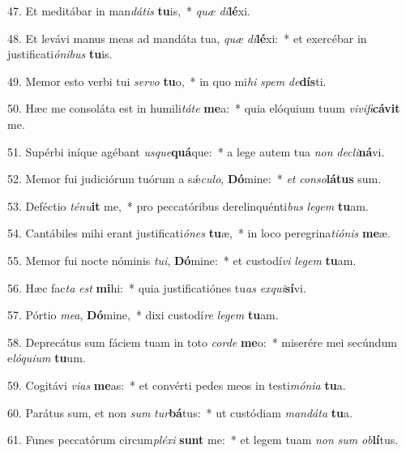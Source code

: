 47. Et meditábar in man\textit{dá}\textit{tis} \textbf{tu}is,~*  \textit{quæ} \textit{di}\textbf{lé}xi.\

48. Et levávi manus meas ad mandáta tua, \textit{quæ} \textit{di}\textbf{lé}xi:~*  et exercébar in justificati\textit{ó}\textit{ni}\textit{bus} \textbf{tu}is.\

49. Memor esto verbi tui \textit{ser}\textit{vo} \textbf{tu}o,~*  in quo mi\textit{hi} \textit{spem} \textit{de}\textbf{dís}ti.\

50. Hæc me consoláta est in humili\textit{tá}\textit{te} \textbf{me}a:~*  quia elóquium tuum \textit{vi}\textit{vi}\textit{fi}\textbf{cá}\textbf{vit} me.\

51. Supérbi iníque agébant \textit{us}\textit{que}\textbf{quá}que:~*  a lege autem tua \textit{non} \textit{de}\textit{cli}\textbf{ná}vi.\

52. Memor fui judiciórum tuórum a sǽ\textit{cu}\textit{lo}, \textbf{Dó}mine:~*  \textit{et} \textit{con}\textit{so}\textbf{lá}\textbf{tus} sum.\

53. Deféctio \textit{té}\textit{nu}\textbf{it} me,~*  pro peccatóribus derelinquénti\textit{bus} \textit{le}\textit{gem} \textbf{tu}am.\

54. Cantábiles mihi erant justificati\textit{ó}\textit{nes} \textbf{tu}æ,~*  in loco peregrina\textit{ti}\textit{ó}\textit{nis} \textbf{me}æ.\

55. Memor fui nocte nóminis \textit{tu}\textit{i}, \textbf{Dó}mine:~*  et custodí\textit{vi} \textit{le}\textit{gem} \textbf{tu}am.\

56. Hæc fac\textit{ta} \textit{est} \textbf{mi}hi:~*  quia justificatiónes tu\textit{as} \textit{ex}\textit{qui}\textbf{sí}vi.\

57. Pórtio \textit{me}\textit{a}, \textbf{Dó}mine,~*  dixi custodí\textit{re} \textit{le}\textit{gem} \textbf{tu}am.\

58. Deprecátus sum fáciem tuam in toto \textit{cor}\textit{de} \textbf{me}o:~*  miserére mei secúndum e\textit{ló}\textit{qui}\textit{um} \textbf{tu}um.\

59. Cogitávi \textit{vi}\textit{as} \textbf{me}as:~*  et convérti pedes meos in testi\textit{mó}\textit{ni}\textit{a} \textbf{tu}a.\

60. Parátus sum, et non \textit{sum} \textit{tur}\textbf{bá}tus:~*  ut custódiam \textit{man}\textit{dá}\textit{ta} \textbf{tu}a.\

61. Funes peccatórum circum\textit{plé}\textit{xi} \textbf{sunt} me:~*  et legem tuam \textit{non} \textit{sum} \textit{ob}\textbf{lí}tus.\

